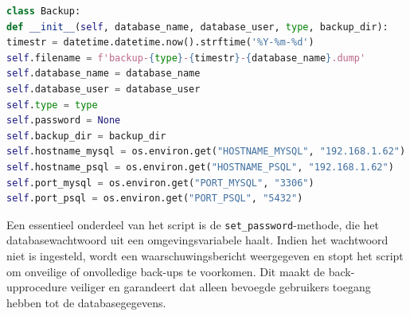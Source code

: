 \begin{lstlisting}[language=Python]
class Backup:
def __init__(self, database_name, database_user, type, backup_dir):
timestr = datetime.datetime.now().strftime('%Y-%m-%d')
self.filename = f'backup-{type}-{timestr}-{database_name}.dump'
self.database_name = database_name
self.database_user = database_user
self.type = type
self.password = None
self.backup_dir = backup_dir
self.hostname_mysql = os.environ.get("HOSTNAME_MYSQL", "192.168.1.62")
self.hostname_psql = os.environ.get("HOSTNAME_PSQL", "192.168.1.62")
self.port_mysql = os.environ.get("PORT_MYSQL", "3306")
self.port_psql = os.environ.get("PORT_PSQL", "5432")
\end{lstlisting}

Een essentieel onderdeel van het script is de \texttt{set\_password}-methode, die het databasewachtwoord uit een omgevingsvariabele haalt. Indien het wachtwoord niet is ingesteld, wordt een waarschuwingsbericht weergegeven en stopt het script om onveilige of onvolledige back-ups te voorkomen. Dit maakt de back-upprocedure veiliger en garandeert dat alleen bevoegde gebruikers toegang hebben tot de databasegegevens.

